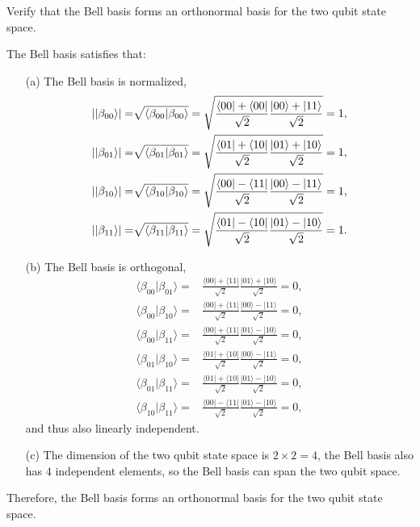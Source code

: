 \documentclass[en]{sol-man}
\begin{document}
\begin{exe}
    Verify that the Bell basis forms an orthonormal basis for the two qubit state space.
\end{exe}
\begin{pf}
    The Bell basis satisfies that:
    \begin{itemize}
        \item[(a)] The Bell basis is normalized,
        \begin{align}
            \left\lvert\lvert\beta_{00}\rangle\right\rvert=&\sqrt{\langle\beta_{00}\vert\beta_{00}\rangle}=\sqrt{\frac{\langle 00\rvert+\langle 00\rvert}{\sqrt{2}}\frac{\lvert 00\rangle+\lvert 11\rangle}{\sqrt{2}}}=1,\\
            \left\lvert\lvert\beta_{01}\rangle\right\rvert=&\sqrt{\langle\beta_{01}\vert\beta_{01}\rangle}=\sqrt{\frac{\langle 01\rvert+\langle 10\rvert}{\sqrt{2}}\frac{\lvert 01\rangle+\lvert 10\rangle}{\sqrt{2}}}=1,\\
            \left\lvert\lvert\beta_{10}\rangle\right\rvert=&\sqrt{\langle\beta_{10}\vert\beta_{10}\rangle}=\sqrt{\frac{\langle 00\rvert-\langle 11\rvert}{\sqrt{2}}\frac{\lvert 00\rangle-\lvert 11\rangle}{\sqrt{2}}}=1,\\
            \left\lvert\lvert\beta_{11}\rangle\right\rvert=&\sqrt{\langle\beta_{11}\vert\beta_{11}\rangle}=\sqrt{\frac{\langle 01\rvert-\langle 10\rvert}{\sqrt{2}}\frac{\lvert 01\rangle-\lvert 10\rangle}{\sqrt{2}}}=1.
        \end{align}
        \item[(b)] The Bell basis is orthogonal,
        \begin{align}
            \langle\beta_{00}\vert\beta_{01}\rangle=&\frac{\langle 00\rvert+\langle 11\rvert}{\sqrt{2}}\frac{\lvert 01\rangle+\lvert 10\rangle}{\sqrt{2}}=0,\\
            \langle\beta_{00}\vert\beta_{10}\rangle=&\frac{\langle 00\rvert+\langle 11\rvert}{\sqrt{2}}\frac{\lvert 00\rangle-\lvert 11\rangle}{\sqrt{2}}=0,\\
            \langle\beta_{00}\vert\beta_{11}\rangle=&\frac{\langle 00\rvert+\langle 11\rvert}{\sqrt{2}}\frac{\lvert 01\rangle-\lvert 10\rangle}{\sqrt{2}}=0,\\
            \langle\beta_{01}\vert\beta_{10}\rangle=&\frac{\langle 01\rvert+\langle 10\rvert}{\sqrt{2}}\frac{\lvert 00\rangle-\lvert 11\rangle}{\sqrt{2}}=0,\\
            \langle\beta_{01}\vert\beta_{11}\rangle=&\frac{\langle 01\rvert+\langle 10\rvert}{\sqrt{2}}\frac{\lvert 01\rangle-\lvert 10\rangle}{\sqrt{2}}=0,\\
            \langle\beta_{10}\vert\beta_{11}\rangle=&\frac{\langle 00\rvert-\langle 11\rvert}{\sqrt{2}}\frac{\lvert 01\rangle-\lvert 10\rangle}{\sqrt{2}}=0,
        \end{align}
        and thus also linearly independent.
        \item[(c)] The dimension of the two qubit state space is $2\times 2=4$, the Bell basis also has $4$ independent elements, so the Bell basis can span the two qubit space.
    \end{itemize}
    Therefore, the Bell basis forms an orthonormal basis for the two qubit state space.
\end{pf}
\end{document}
